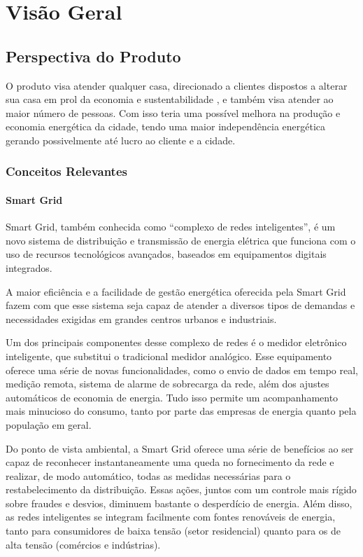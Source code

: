 \chapter{Visão Geral}
    \section{Perspectiva do Produto}
        \par O produto visa atender qualquer casa, direcionado a clientes dispostos a alterar sua casa em prol da economia e sustentabilidade , e também visa atender ao maior número de pessoas. Com isso teria uma  possível melhora na produção e economia energética da cidade, tendo uma maior independência energética gerando possivelmente até lucro ao cliente e a cidade.
        
        \subsection{Conceitos Relevantes}
            \subsubsection{Smart Grid}
                \par Smart Grid, também conhecida como “complexo de redes inteligentes”, é um novo sistema de distribuição e transmissão de energia elétrica que funciona com o uso de recursos tecnológicos avançados, baseados em equipamentos digitais integrados. \par A maior eficiência e a facilidade de gestão energética oferecida pela Smart Grid fazem com que esse sistema seja capaz de atender a diversos tipos de demandas e necessidades exigidas em grandes centros urbanos e industriais. \cite{cpflenergia}
                \par Um dos principais componentes desse complexo de redes é o medidor eletrônico inteligente, que substitui o tradicional medidor analógico. Esse equipamento oferece uma série de novas funcionalidades, como o envio de dados em tempo real, medição remota, sistema de alarme de sobrecarga da rede, além dos ajustes automáticos de economia de energia. Tudo isso permite um acompanhamento mais minucioso do consumo, tanto por parte das empresas de energia quanto pela população em geral. \cite{ecycle}
                \par Do ponto de vista ambiental, a Smart Grid oferece uma série de benefícios ao ser capaz de reconhecer instantaneamente uma queda no fornecimento da rede e realizar, de modo automático, todas as medidas necessárias para o restabelecimento da distribuição. Essas ações, juntos com um controle mais rígido sobre fraudes e desvios, diminuem bastante o desperdício de energia.  Além disso, as redes inteligentes se integram facilmente com fontes renováveis de energia, tanto para consumidores de baixa tensão (setor residencial) quanto para os de alta tensão (comércios e indústrias). \cite{siemens}
